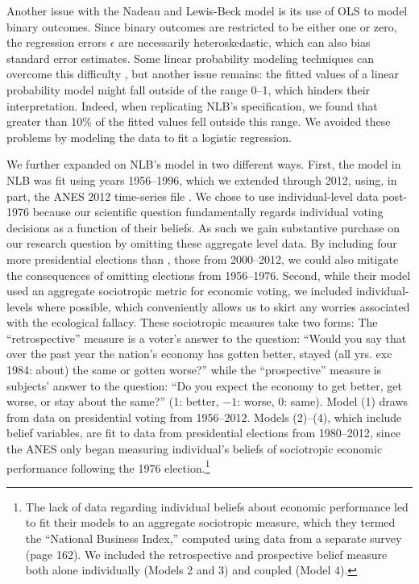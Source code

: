 \documentclass[11pt]{article}
\begin{document}
 

Another issue with the Nadeau and Lewis-Beck model is its use of OLS to model binary outcomes. Since binary outcomes are restricted to be either one or zero, the regression errors $\epsilon$ are necessarily heteroskedastic, which can also bias standard error estimates. Some linear probability modeling techniques can overcome this difficulty \citep[see, e.g.][ sec. 4.6]{agresti2002categorical}, but another issue remains: the fitted values of a linear probability model might fall outside of the range 0--1, which hinders their interpretation. Indeed, when replicating NLB's specification, we found that greater than 10\% of the fitted values fell outside this range. We avoided these problems by modeling the data to fit a logistic regression.%



We further expanded on NLB's model in two different ways. First, the model in NLB was fit using years 1956--1996, which we extended through 2012, using, in part, the ANES 2012 time-series file \cite{ANES2012}. 
We chose to use individual-level data post-1976 because our scientific question fundamentally regards individual voting decisions as a function of their beliefs. As such we gain substantive purchase on our research question by omitting these aggregate level data. By including four more presidential elections than \citet{Nadeau:2001tw}, those from 2000--2012, we could also mitigate the consequences of omitting elections from 1956--1976.
Second, while their model used an aggregate sociotropic metric for economic voting, we included individual-levels where possible, which conveniently allows us to skirt any worries associated with the ecological fallacy. These sociotropic measures take two forms:
The ``retrospective'' measure is a voter's answer to the question: ``Would you say that over the past year the nation's economy has gotten better, stayed (all yrs. exc 1984: about) the same or gotten worse?'' while
 the ``prospective'' measure is subjects' answer to the question: ``Do you expect the economy to get better, get
worse, or stay about the same?'' (1: better, $-1$: worse, 0: same). Model (1) draws from data on presidential voting from 1956--2012. Models (2)--(4), which include belief variables, are fit to data from presidential elections from 1980--2012, since the ANES only began measuring individual's beliefs of sociotropic economic performance following the 1976 election.\footnote{The lack of data regarding individual beliefs about economic performance led \citet{Nadeau:2001tw} to fit their models to an aggregate sociotropic measure, which they termed the ``National Business Index,'' computed using data from a separate survey (page 162). We included the retrospective and prospective belief measure both alone individually (Models 2 and 3) and coupled (Model 4).}
\end{document}
